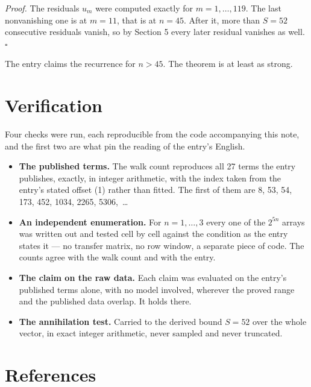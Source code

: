 \documentclass[11pt]{article}
\theoremstyle{definition}
\begin{document}
{\itshape Proof.} The residuals $u_m$ were computed exactly for $m = 1,\dots,119$. The last nonvanishing one is at $m = 11$, that is at $n = 45$. After it, more than $S = 52$ consecutive residuals vanish, so by Section 5 every later residual vanishes as well. $\square$

The entry claims the recurrence for $n > 45$. The theorem is at least as strong.

\section{Verification}

Four checks were run, each reproducible from the code accompanying this note, and the first two are what pin the reading of the entry's English.

\begin{itemize}

\item {\bfseries The published terms.} The walk count reproduces all 27 terms the entry publishes, exactly, in integer arithmetic, with the index taken from the entry's stated offset (1) rather than fitted. The first of them are 8, 53, 54, 173, 452, 1034, 2265, 5306,~\dots

\item {\bfseries An independent enumeration.} For $n = 1,\dots,3$ every one of the $2^{5n}$ arrays was written out and tested cell by cell against the condition as the entry states it --- no transfer matrix, no row window, a separate piece of code. The counts agree with the walk count and with the entry.

\item {\bfseries The claim on the raw data.} Each claim was evaluated on the entry's published terms alone, with no model involved, wherever the proved range and the published data overlap. It holds there.

\item {\bfseries The annihilation test.} Carried to the derived bound $S = 52$ over the whole vector, in exact integer arithmetic, never sampled and never truncated.

\end{itemize}

\section{References}
\end{document}
